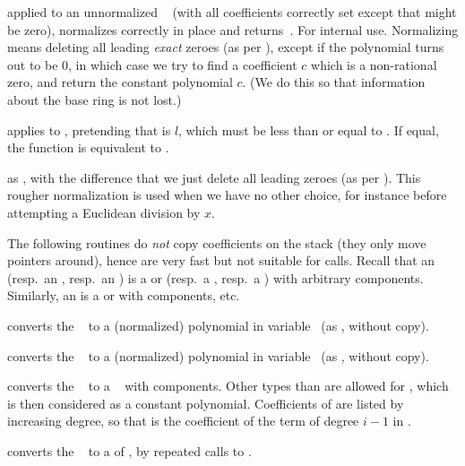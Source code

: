  applied to an unnormalized ~
(with all coefficients correctly set except that  might
be zero), normalizes  correctly in place and returns~. For
internal use. Normalizing means deleting all leading \emph{exact} zeroes
(as per ), except if the polynomial turns out to be $0$,
in which case we try to find a coefficient $c$ which is a non-rational zero,
and return the constant polynomial $c$. (We do this so that information
about the base ring is not lost.)

 applies  to
, pretending that  is $l$, which must be less than
or equal to . If equal, the function is equivalent to
.

 as ,
with the difference that we just delete all leading zeroes (as per
). This rougher normalization is used when we have no other
choice, for instance before attempting a Euclidean division by $x$.

The following routines do \emph{not} copy coefficients on the stack (they
only move pointers around), hence are very fast but not suitable for
 calls. Recall that an  (resp.~an , resp.~an
) is a  or  (resp.~a , resp.~a )
with arbitrary components. Similarly, an  is a  or
 with  components, etc.

 converts the ~ to a
(normalized) polynomial in variable~ (as , without
copy).

 converts the ~
to a (normalized) polynomial in variable~ (as ,
without copy).

 converts the ~ to a
~ with  components. Other types than  are
allowed for , which is then considered as a constant polynomial.
Coefficients of  are listed by increasing degree, so that 
is the coefficient of the term of degree $i-1$ in .

 converts the ~ to a
 of , by repeated calls to .

